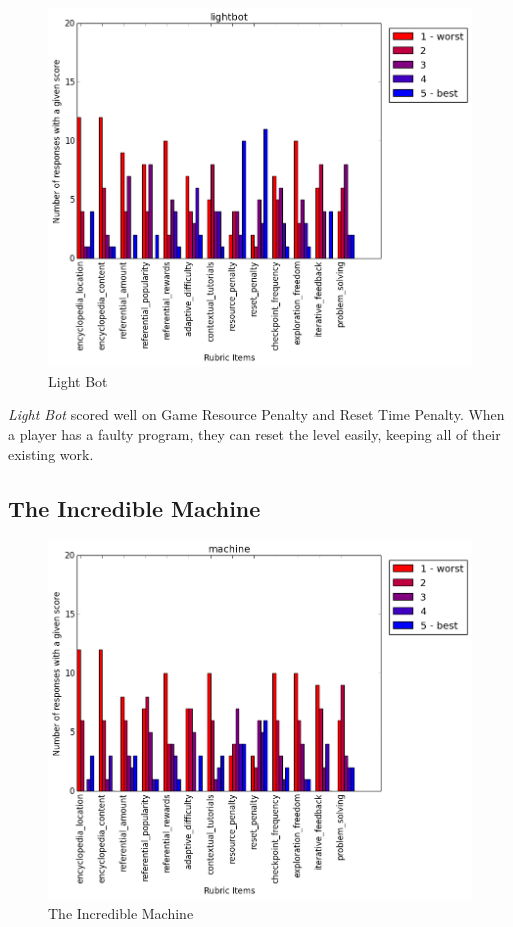 				\begin{figure}[] 
				\centering 
				\includegraphics[width=\textwidth, height=.4\textheight, keepaspectratio=true]{lightbot_scores.png} 
				\caption{Light Bot}
				\end{figure}

				\textit{Light Bot} scored well on Game Resource Penalty and Reset Time Penalty. When a player has a faulty program, they can reset the level easily, keeping all of their existing work.

			\subsection{The Incredible Machine}

				\begin{figure}[] 
				\centering 
				\includegraphics[width=\textwidth, height=.4\textheight, keepaspectratio=true]{machine_scores.png} 
				\caption{The Incredible Machine}
				\end{figure}


